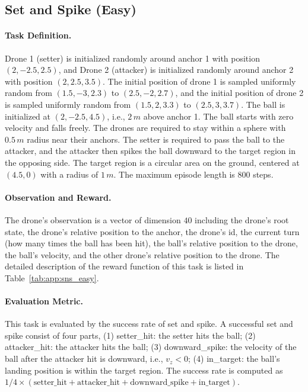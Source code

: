 \subsection{Set and Spike (Easy)}

\paragraph{Task Definition.}
Drone 1 (setter) is initialized randomly around anchor 1 with position $(2, -2.5, 2.5)$, and Drone 2 (attacker) is initialized randomly around anchor 2 with position $(2, 2.5, 3.5)$. The initial position of drone 1 is sampled uniformly random from $(1.5, -3, 2.3)$ to $(2.5, -2, 2.7)$, and the initial position of drone 2 is sampled uniformly random from $(1.5, 2, 3.3)$ to $(2.5, 3, 3.7)$. The ball is initialized at $(2, -2.5, 4.5)$, i.e., $2\,m$ above anchor 1. The ball starts with zero velocity and falls freely. 
The drones are required to stay within a sphere with $0.5\,m$ radius near their anchors. The setter is required to pass the ball to the attacker, and the attacker then spikes the ball downward to the target region in the opposing side. The target region is a circular area on the ground, centered at $(4.5, 0)$ with a radius of $1\,m$. The maximum episode length is 800 steps.

\paragraph{Observation and Reward.}
The drone's observation is a vector of dimension $40$ including the drone's root state, the drone's relative position to the anchor, the drone's id, the current turn (how many times the ball has been hit), the ball's relative position to the drone, the ball's velocity, and the other drone's relative position to the drone. The detailed description of the reward function of this task is listed in Table~\ref{tab:app:sns_easy}.

\paragraph{Evaluation Metric.}
This task is evaluated by the success rate of set and spike. A successful set and spike consist of four parts, (1) setter\_hit: the setter hits the ball; (2) attacker\_hit: the attacker hits the ball; (3) downward\_spike: the velocity of the ball after the attacker hit is downward, i.e., $v_z < 0$; (4) in\_target: the ball's landing position is within the target region. The success rate is computed as $1/4\times(\text{setter\_hit}+\text{attacker\_hit}+\text{downward\_spike}+\text{in\_target})$.


